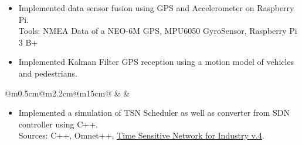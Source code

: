 \documentclass[10pt,a4paper]{article}
\begin{document}
\vspace{-1em}
\begin{itemize}[leftmargin=*]
  \item  Implemented data sensor fusion using GPS and Accelerometer on Raspberry Pi.  
  \\ {\fontsize{10pt}{10pt}\selectfont\textcolor{blocktext2_color}{Tools: NMEA Data of a NEO-6M GPS, MPU6050 GyroSensor, Raspberry Pi 3 B+}}
  \item Implemented Kalman Filter GPS reception using a motion model of vehicles and pedestrians.
\end{itemize}                               

\vspace{1.3em}
\begin{tabular}{@{}m{0.5cm}@{\hspace{0.5em}}m{2.2cm}@{\hspace{0.5em}}m{15cm}@{}}
   & 
  \raisebox{1em}{\begin{minipage}[t]{\linewidth}
  \centering
    \textcolor{blocktitle1_color}{Sep. 16}\\
    \textcolor{blocktitle1_color}{Feb. 17}
  \end{minipage} 
  } &
\end{tabular}                                

\vspace{0.4em}
\begin{itemize}[leftmargin=*]
  \item Implemented a simulation of TSN Scheduler as well as converter from SDN controller using C++.\\ {\fontsize{10pt}{10pt}\selectfont\textcolor{blocktext2_color}{\fontsize{10pt}{10pt}\selectfont\textcolor{blocktext2_color}{Sources: C++, Omnet++, }}} {\fontsize{10pt}{10pt}\selectfont\textcolor{blocktext2_color}{\href{https://1.ieee802.org/tsn/}{Time Sensitive Network for Industry v.4}}}.       
\end{itemize}    
\end{document}
